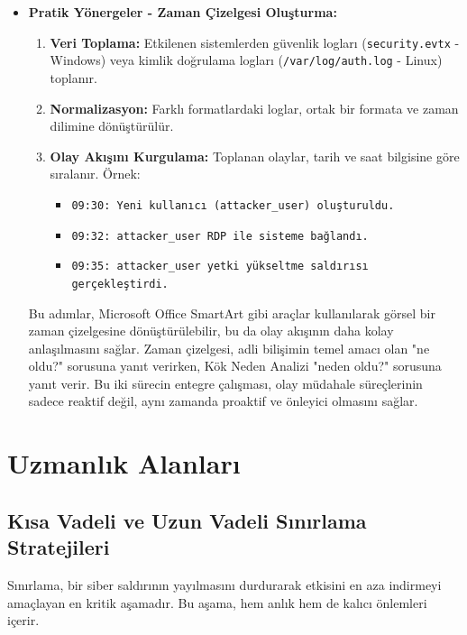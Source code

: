 \begin{itemize}
\begin{itemize}
    \item \textbf{Pratik Yönergeler - Zaman Çizelgesi Oluşturma:}
    \begin{enumerate}
        \item \textbf{Veri Toplama:} Etkilenen sistemlerden güvenlik logları (\texttt{security.evtx} - Windows) veya kimlik doğrulama logları (\texttt{/var/log/auth.log} - Linux) toplanır.
        \item \textbf{Normalizasyon:} Farklı formatlardaki loglar, ortak bir formata ve zaman dilimine dönüştürülür.
        \item \textbf{Olay Akışını Kurgulama:} Toplanan olaylar, tarih ve saat bilgisine göre sıralanır. Örnek:
        \begin{itemize}
            \item \texttt{09:30: Yeni kullanıcı (attacker\_user) oluşturuldu.}
            \item \texttt{09:32: attacker\_user RDP ile sisteme bağlandı.}
            \item \texttt{09:35: attacker\_user yetki yükseltme saldırısı gerçekleştirdi.}
        \end{itemize}
    \end{enumerate}
    Bu adımlar, Microsoft Office SmartArt gibi araçlar kullanılarak görsel bir zaman çizelgesine dönüştürülebilir, bu da olay akışının daha kolay anlaşılmasını sağlar. Zaman çizelgesi, adli bilişimin temel amacı olan "ne oldu?" sorusuna yanıt verirken, Kök Neden Analizi "neden oldu?" sorusuna yanıt verir. Bu iki sürecin entegre çalışması, olay müdahale süreçlerinin sadece reaktif değil, aynı zamanda proaktif ve önleyici olmasını sağlar.
\end{itemize}

\section{Uzmanlık Alanları}

\subsection{Kısa Vadeli ve Uzun Vadeli Sınırlama Stratejileri}

Sınırlama, bir siber saldırının yayılmasını durdurarak etkisini en aza indirmeyi amaçlayan en kritik aşamadır. Bu aşama, hem anlık hem de kalıcı önlemleri içerir.


\end{itemize}
